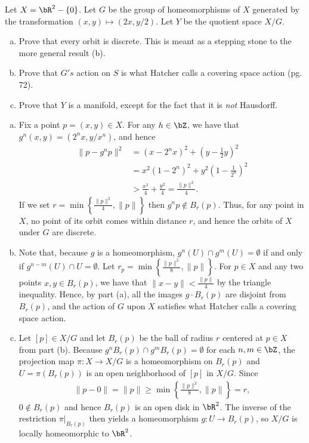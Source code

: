 \begin{homework}[e]
\newpage

 Let $X = \bR^2 - \{0\}$. Let $G$ be the group of homeomorphisms of $X$ generated by the transformation $(x,y) \mapsto (2x,y/2)$. Let $Y$ be the quotient space $X/G$.
\begin{enumerate}[(a)]
  \item Prove that every orbit is discrete. This is meant as a stepping stone to the more general result (b).
  \item Prove that $G's$ action on $S$ is what Hatcher calls a covering space action (pg. 72).
  \item Prove that $Y$ is a manifold, except for the fact that it is \emph{not} Hausdorff.
\end{enumerate}
\begin{prf}
  \begin{enumerate}[(a)]
    \item Fix a point $p = (x,y) \in X$. For any $h \in \bZ$, we have that $g^n(x,y) = \left(2^nx,y/x^n\right)$, and hence
  \begin{align*}
    \|p - g^np\|^2 &= (x - 2^nx)^2 + (y - \frac{1}{2}y)^2 \\
                           &= x^2\left(1 - 2^n\right)^2 + y^2\left(1 - \frac{1}{2^n}\right)^2 \\
                           &> \frac{x^2}{4} + \frac{y^2}{4} = \frac{\|p\|^2}{4}.
  \end{align*}
  If we set $r = \min\left\{\frac{\|p\|^2}{4}, \|p\|\right\}$ then $g^np \not\in B_r(p)$. Thus, for any point in $X$, no point of its orbit comes within distance $r$, and hence the orbits of $X$ under $G$ are discrete.

  \item Note that, because $g$ is a homeomorphism, $g^n(U) \cap g^m(U) = \emptyset$ if and only if $g^{n - m}(U) \cap U = \emptyset$. Let $r_p = \min\left\{\frac{\|p\|^2}{8},\|p\|\right\}$. For $p \in X$ and any two points $x,y \in B_r(p)$, we have that $\|x - y\| < \frac{\|p\|}{4}$ by the triangle inequality. Hence, by part (a), all the images $g\cdot B_r(p)$ are disjoint from $B_r(p)$, and the action of $G$ upon $X$ satisfies what Hatcher calls a covering space action.

  \item Let $[p] \in X/G$ and let $B_r(p)$ be the ball of radius $r$ centered at $p \in X$ from part (b). Because $g^n B_r(p) \cap g^mB_r(p) = \emptyset$ for each $n,m \in \bZ$, the projection map $\pi:X\to X/G$ is a homeomorphism on $B_r(p)$ and $U = \pi(B_r(p))$ is an open neighborhood of $[p]$ in $X/G$. Since
    \begin{align*}
      \|p - 0\| = \|p\| \geq \min\left\{\frac{\|p\|^2}{8},\|p\|\right\} = r,
    \end{align*}
    $0 \not\in B_r(p)$ and hence $B_r(p)$ is an open disk in $\bR^2$. The inverse of the restriction $\pi|_{B_r(p)}$ then yields a homeomorphism $g:U\to B_r(p)$, so $X/G$ is locally homeomorphic to $\bR^2$.


\end{enumerate}
\end{prf}
\end{homework}
